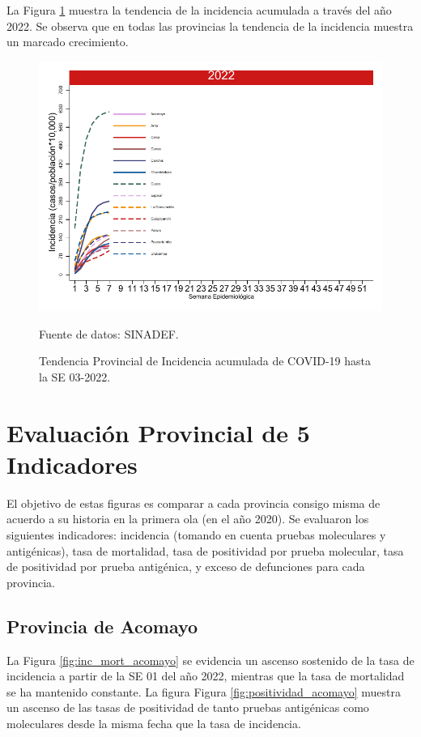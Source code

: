\documentclass[12pt,a4paper,openany]{book}
\begin{document}
La Figura \ref{fig:incidencia_provincial} muestra la tendencia de la incidencia acumulada a través del año 2022. Se observa que en todas las provincias la tendencia de la incidencia muestra un marcado crecimiento. 
%
\begin{figure}[h]
	\caption{Tendencia Provincial de Incidencia acumulada de COVID-19 hasta la SE 03-2022. }\label{fig:incidencia_provincial}
	\begin{center}
		\includegraphics[width=0.65\linewidth]{../figuras/incidencia_provincial_2022.pdf}
	\end{center}
	{\footnotesize {Fuente de datos: SINADEF.}}
\end{figure}

\clearpage
	
\section*{Evaluación Provincial de 5 Indicadores}
		\noindent El objetivo de estas figuras es comparar a cada provincia consigo misma de acuerdo a su historia  en la primera ola (en el año 2020). Se evaluaron los siguientes indicadores: incidencia (tomando en cuenta pruebas moleculares y antigénicas), tasa de mortalidad, tasa de positividad por prueba molecular, tasa de positividad por prueba antigénica, y exceso de defunciones para cada provincia.
		
		\subsection*{Provincia de Acomayo}
		\noindent La Figura \ref{fig:inc_mort_acomayo} se evidencia un ascenso sostenido de la tasa de incidencia a partir de la SE 01 del año 2022, mientras que la tasa de mortalidad se ha mantenido constante. 
		\noindent La figura Figura \ref{fig:positividad_acomayo} muestra un ascenso de las tasas de positividad de tanto pruebas antigénicas como moleculares desde la misma fecha que la tasa de incidencia. 
		
\end{document}
